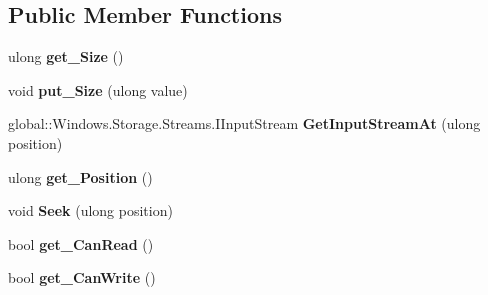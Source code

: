 \subsection*{Public Member Functions}
\begin{DoxyCompactItemize}
\item 
\mbox{\label{interface_windows_1_1_storage_1_1_streams_1_1_i_random_access_stream_a6a413a2448bfb33490c1228972b1ac8c}} 
ulong {\bfseries get\+\_\+\+Size} ()
\item 
\mbox{\label{interface_windows_1_1_storage_1_1_streams_1_1_i_random_access_stream_af1e96ffb576c8a390fa379fcb6923c44}} 
void {\bfseries put\+\_\+\+Size} (ulong value)
\item 
\mbox{\label{interface_windows_1_1_storage_1_1_streams_1_1_i_random_access_stream_a937b4579f3c69b8f3e102e47786cd661}} 
global\+::\+Windows.\+Storage.\+Streams.\+I\+Input\+Stream {\bfseries Get\+Input\+Stream\+At} (ulong position)
\item 
\mbox{\label{interface_windows_1_1_storage_1_1_streams_1_1_i_random_access_stream_aac0ed113bee77668c3882dd6d533c50e}} 
ulong {\bfseries get\+\_\+\+Position} ()
\item 
\mbox{\label{interface_windows_1_1_storage_1_1_streams_1_1_i_random_access_stream_a85c3af465abf7d76b4e63d17a6822fb0}} 
void {\bfseries Seek} (ulong position)
\item 
\mbox{\label{interface_windows_1_1_storage_1_1_streams_1_1_i_random_access_stream_ae4d5064fd211749208909f7f6fe63102}} 
bool {\bfseries get\+\_\+\+Can\+Read} ()
\item 
\mbox{\label{interface_windows_1_1_storage_1_1_streams_1_1_i_random_access_stream_a4794da7c24985d3c5fd5660548461faf}} 
bool {\bfseries get\+\_\+\+Can\+Write} ()
\item 

\end{DoxyCompactItemize}
